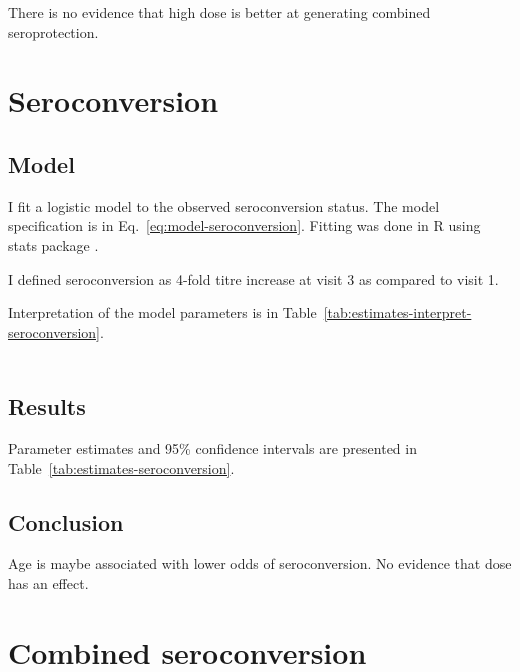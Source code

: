 \documentclass[11pt]{article}
\begin{document}
There is no evidence that high dose is better at generating combined
seroprotection.

\section{Seroconversion}

\subsection{Model}

I fit a logistic model to the observed seroconversion status.
The model specification is in Eq.~\ref{eq:model-seroconversion}.
Fitting was done in R using stats package \cite{R}.

I defined seroconversion as 4-fold titre increase at visit 3 as compared to
visit 1.

Interpretation of the model parameters is in
Table~\ref{tab:estimates-interpret-seroconversion}.

\begin{equation}
    \begin{gathered}
        \label{eq:model-seroconversion}
        
    \end{gathered}
\end{equation}





\subsection{Results}

Parameter estimates and 95\% confidence intervals
are presented in Table~\ref{tab:estimates-seroconversion}.



\subsection{Conclusion}

Age is maybe associated with lower odds of seroconversion. No evidence that
dose has an effect.

\section{Combined seroconversion}
\end{document}
